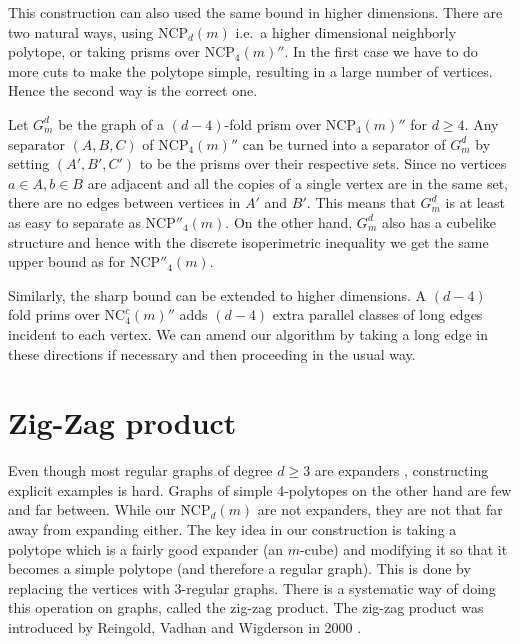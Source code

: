 \documentclass[a4paper,12pt]{book}
\theoremstyle{plain}
\theoremstyle{definition}
\newcommand\NC{\textrm{NCP}}
\newcommand\NCC{\mathrm{NC}^c}
\begin{document}
This construction can also used the same bound in higher dimensions. There are two 
natural ways, using $\NC_d(m)$ i.e.\ a higher dimensional neighborly polytope, or 
taking prisms over $\NC_4(m)''$.  In the first case we have to do more cuts to 
make the polytope simple, resulting in a large number of vertices. Hence the 
second way is the correct one. 

Let $G^d_m$ be the graph of a $(d-4)$-fold prism over $\NC_4(m)''$ for $d\geq 4$. 
Any separator 
$(A,B,C)$ of $\NC_4(m)''$ can be turned into a separator of $G^d_m$ by setting 
$(A',B',C')$ to be the prisms over their respective sets. Since no vertices 
$a\in A, b\in B$ are adjacent and all the copies of a single vertex are in the 
same set, there are no edges between vertices in $A'$ and $B'$. This means that 
$G^d_m$ is at least as easy to separate as $\NC''_4(m)$. On the other hand, $G^d_m$ 
also has a cubelike structure and hence with the discrete isoperimetric 
inequality we get the same upper bound as for $\NC''_4(m)$. 

Similarly, the sharp bound can be extended to higher dimensions. A $(d-4)$ fold
prims over $\NCC_4(m)''$ adds $(d-4)$ extra parallel classes of long edges incident
to each vertex. We can amend our algorithm by taking a long edge in these directions 
if necessary and then proceeding in the usual way.

\section{Zig-Zag product}

Even though most regular graphs of degree $d\ge 3$ are expanders \cite{KoBa1967}, 
constructing explicit examples is hard. Graphs of simple 4-polytopes on the other hand
are few and far between. While our $\NC_d(m)$ are not expanders, they are not that  
far away from expanding either. The key idea in our construction is taking a polytope which
is a fairly good expander (an $m$-cube)
and modifying it so that it becomes a simple polytope (and therefore a regular graph). This
is done by replacing the vertices with 3-regular graphs. There is a systematic way of doing this operation
on graphs, called
the zig-zag product. The zig-zag product was introduced by Reingold, Vadhan and Wigderson in 2000 
\cite{892006}. 
\end{document}
